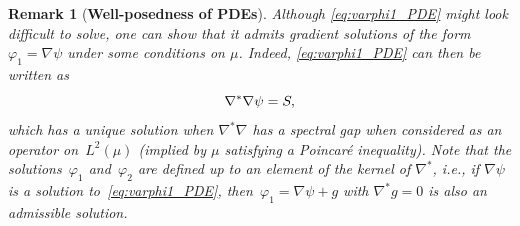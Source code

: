 \documentclass[11pt]{article}
\newtheorem{remark}[theorem]{Remark}
\theoremstyle{definition}
\begin{document}
\begin{remark}[{\bf Well-posedness of PDEs}]
Although \eqref{eq:varphi1_PDE} might look difficult to solve, one can show that it admits gradient solutions of the form $\varphi_1 = \nabla\psi$ under some conditions on $\mu$. Indeed, \eqref{eq:varphi1_PDE} can then be written as
\begin{equation}
\notag
	\nabla^*\nabla \psi = S, 
	\end{equation}
which has a unique solution when $\nabla^*\nabla$ has a spectral gap when considered as an operator on~$L^2(\mu)$ (implied by $\mu$ satisfying a Poincar\'e inequality). Note that the solutions~$\varphi_1$ and~$\varphi_2$ are defined up to an element of the kernel of $\nabla^*$, i.e., if $\nabla\psi$ is a solution to~\eqref{eq:varphi1_PDE}, then~$\varphi_1 = \nabla\psi + g$ with $\nabla^*g = 0$ is also an admissible solution. \end{remark}
\end{document}
